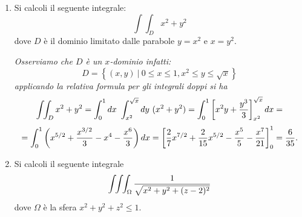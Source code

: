 \documentclass[12pt,a4paper]{report}\pagenumbering{roman}
\begin{document}
\begin{enumerate}
{\bf SOLUZIONE:} {\sl Sia $F(x,y,z)=x^4+3y^3-4z^6$. Osserviamo che il
gradiente 
$$\nabla(F)(1,1,1)=(4x^3,9y^2,-24z^5)_{(1,1,1)}=(4,9,-24)$$
\`e normale alla superficie $F(x,y,z)=0$ nel punto $(1,1,1)$.
Quindi l'equazione del piano tangente $\pi$ in $(1,1,1)$
\`e data da:
$$(x-1,y-1,z-1)\cdot\nabla(F)(1,1,1)=0$$
e l'equazione parametrica
della retta ${\bf r}$ normale \`e data da 
$(x,y,z)=(1,1,1)+t\nabla(F)(1,1,1).$ Facendo i calcoli arriviamo a
$$\pi: 4x+9y-24z+11=0\ \ \ \ \mbox{e}\ \ \ \ {\bf r}:\left\{ 
\begin{array}{l}x=1+4t \\ y=1+9t \\ z=1-24t
\end{array}\right.$$
Poich\'e tutte e tre le derivate parziali sono non nulle nel punto $(1,1,1)$,
possiamo applicare il TFI rispetto a tutte le variabili e si ha
$$\nabla(f(x,y))(1,1)=-\left({F_x(1,1,1)\over F_z(1,1,1)},
{F_y(1,1,1)\over F_z(1,1,1)}\right)=\left({1\over 6},{3\over8}\right).$$
$$\nabla(h(x,z))(1,1)=-\left({F_x(1,1,1)\over F_y(1,1,1)},
{F_z(1,1,1)\over F_y(1,1,1)}\right)=\left(-{4\over 9},{8\over3}\right).$$
$$\nabla(g(y,z))(1,1)=-\left({F_y(1,1,1)\over F_x(1,1,1)},
{F_z(1,1,1)\over F_x(1,1,1)}\right)=\left(-{9\over 4},6\right).$$
dove $f$, $h$ e $g$ sono definite da
$F(x,y,f(x,y))=F(x,h(x,z),z)=F(g(y,z),y,z)=0$.}\bigskip

\item Si calcoli il seguente integrale:
$$\int\!\!\int_{D}x^2+y^2$$
dove $D$ \`e il dominio limitato dalle parabole $y=x^2$ e $x=y^2$.

 {\sl Osserviamo che $D$ \`e un $x$-dominio
infatti:
$$D=\left\{(x,y)\ |\ 0\leq x\leq1, x^2\leq y\leq\sqrt{x}\right\}$$
applicando la relativa formula per gli integrali doppi si ha
$$\int\!\!\int_{D}x^2+y^2=
\int_0^1dx\ \int_{x^2}^{\sqrt{x}}dy\ (x^2+y^2)=
\int_0^1\left[x^2y+{y^3\over3}\right]_{x^2}^{\sqrt{x}}dx=$$
$$= \int_0^1\left(x^{5/2}+{x^{3/2}\over3}-x^4-{x^6\over3}
\right)dx=\left[{2\over7}x^{7/2}+{2\over15}x^{5/2}
-{x^5\over5}-{x^7\over21}\right]^1_0={6\over35}.$$}

\item Si calcoli il seguente integrale 
$$\int\!\!\int\!\!\int_{\Omega} {1\over \sqrt{x^2+y^2+(z-2)^2}}$$
dove $\Omega$ \`e la sfera $x^2+y^2+z^2\leq1$.


\end{enumerate}
\end{document}
